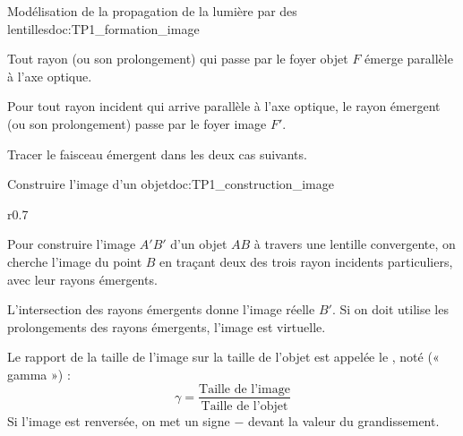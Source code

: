 \begin{doc}{Modélisation de la propagation de la lumière par des lentilles}{doc:TP1_formation_image}
\begin{listePoints}
    \item Tout rayon (ou son prolongement) qui passe par le foyer objet $F$ émerge parallèle à l'axe optique.
    \begin{center}
    \end{center}
  
    \item Pour tout rayon incident qui arrive parallèle à l'axe optique, le rayon émergent (ou son prolongement) passe par le foyer image $F'$.
    \begin{center}
    \end{center}
  \end{listePoints}
\end{doc}

\mesure
Tracer le faisceau émergent dans les deux cas suivants.
\begin{center}
\end{center}

\begin{doc}{Construire l'image d'un objet}{doc:TP1_construction_image}
  \begin{wrapfigure}[7]{r}{0.7\linewidth}
    \vspace*{-34pt}
    \centering
  \end{wrapfigure}
  Pour construire l'image $A'B'$ d'un objet $AB$ à travers une lentille convergente, on cherche l'image du point $B$ en traçant deux des trois rayon incidents particuliers, avec leur rayons émergents.

  L'intersection des rayons émergents donne l'image réelle $B'$.
  Si on doit utilise les prolongements des rayons émergents, l'image est virtuelle.

  Le rapport de la taille de l'image sur la taille de l'objet est appelée le , noté \important{$\gamma$} (« gamma ») :
  \begin{equation*}
    \gamma = \dfrac{\text{Taille de l'image}}{\text{Taille de l'objet}}
  \end{equation*}
  Si l'image est renversée, on met un signe $-$ devant la valeur du grandissement.
\end{doc}

